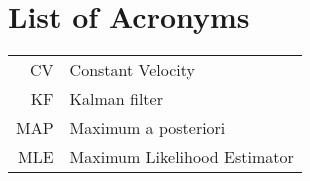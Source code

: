 \chapter{List of Acronyms}

\begin{tabular}{rl}
CV & Constant Velocity \\
KF & Kalman filter \\
MAP & Maximum a posteriori \\
MLE & Maximum Likelihood Estimator \\
\end{tabular}
